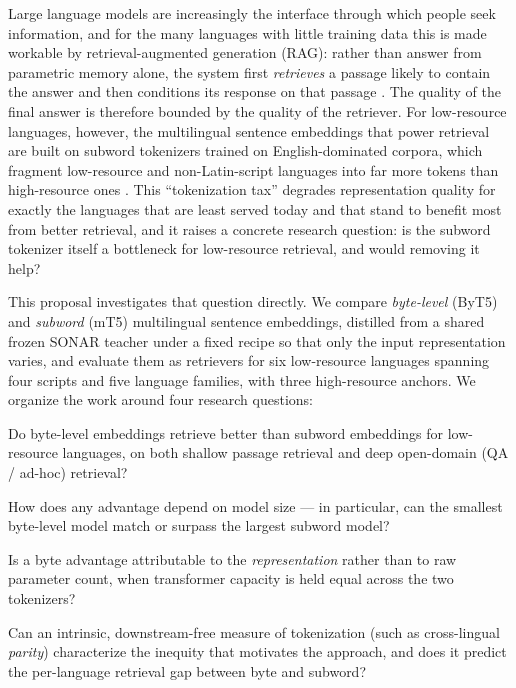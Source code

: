 \documentclass[11pt]{article}
\begin{document}
Large language models are increasingly the interface through which people seek information, and for
the many languages with little training data this is made workable by retrieval-augmented generation
(RAG): rather than answer from parametric memory alone, the system first \emph{retrieves} a passage
likely to contain the answer and then conditions its response on that passage \citep{lewis2020rag}.
The quality of the final answer is therefore bounded by the quality of the retriever. For
low-resource languages, however, the multilingual sentence embeddings that power retrieval are built
on subword tokenizers trained on English-dominated corpora, which fragment low-resource and
non-Latin-script languages into far more tokens than high-resource ones \citep{petrov2023, ahia2023}.
This ``tokenization tax'' degrades representation quality for exactly the languages that are least
served today and that stand to benefit most from better retrieval, and it raises a concrete
research question: is the subword tokenizer itself a bottleneck for low-resource retrieval, and would
removing it help?

This proposal investigates that question directly. We compare \emph{byte-level} (ByT5) and
\emph{subword} (mT5) multilingual sentence embeddings, distilled from a shared frozen SONAR teacher
under a fixed recipe so that only the input representation varies, and evaluate them as retrievers
for six low-resource languages spanning four scripts and five language families, with three
high-resource anchors. We organize the work around four research questions:

\begin{description}[leftmargin=2.2em,style=nextline,itemsep=2pt]
  \item[\textbf{RQ1.}] Do byte-level embeddings retrieve better than subword embeddings for
  low-resource languages, on both shallow passage retrieval and deep open-domain (QA / ad-hoc)
  retrieval?
  \item[\textbf{RQ2.}] How does any advantage depend on model size --- in particular, can the
  smallest byte-level model match or surpass the largest subword model?
  \item[\textbf{RQ3.}] Is a byte advantage attributable to the \emph{representation} rather than to
  raw parameter count, when transformer capacity is held equal across the two tokenizers?
  \item[\textbf{RQ4.}] Can an intrinsic, downstream-free measure of tokenization (such as
  cross-lingual \emph{parity}) characterize the inequity that motivates the approach, and does it
  predict the per-language retrieval gap between byte and subword?
\end{description}
\end{document}
